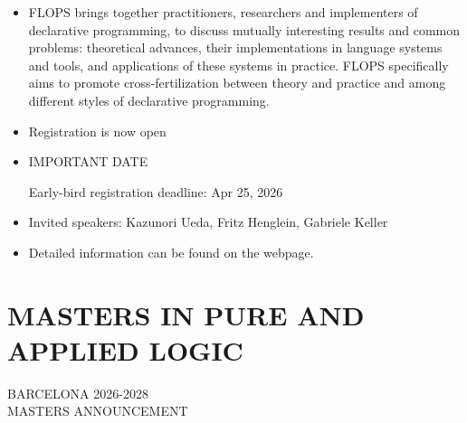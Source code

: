\documentclass[prodmode,acmtecs]{acmsmall} %
\begin{document}
\begin{itemize}\item  FLOPS brings together practitioners, researchers and implementers of declarative programming, to discuss mutually interesting results and common problems: theoretical advances, their implementations in language systems and tools, and applications of these systems in practice. FLOPS specifically aims to promote cross-fertilization between theory and practice and among different styles of declarative programming.  
 
\item  Registration is now open 
 
\item  IMPORTANT DATE 
 
Early-bird registration deadline: Apr 25, 2026 
 
\item  Invited speakers: Kazunori Ueda, Fritz Henglein, Gabriele Keller 
 
\item  Detailed information can be found on the webpage. 
 
\end{itemize}\section{MASTERS IN PURE AND APPLIED LOGIC}\label{MASTERSINPUREANDAPPLIEDLOGIC}  BARCELONA 2026-2028 \\ 
MASTERS ANNOUNCEMENT 
\end{document}
